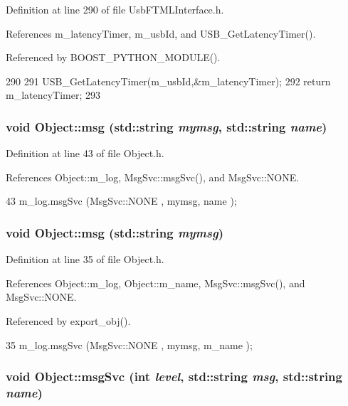 Definition at line 290 of file UsbFTMLInterface.h.

References m\_\-latencyTimer, m\_\-usbId, and USB\_\-GetLatencyTimer().

Referenced by BOOST\_\-PYTHON\_\-MODULE().


\begin{DoxyCode}
290                                 {
291     USB_GetLatencyTimer(m_usbId,&m_latencyTimer);
292     return m_latencyTimer;
293   }
\end{DoxyCode}
\hypertarget{classObject_ac5d59299273cee27aacf7de00d2e7034}{
\subsubsection[{msg}]{\setlength{\rightskip}{0pt plus 5cm}void Object::msg (std::string {\em mymsg}, \/  std::string {\em name})}}
\label{classObject_ac5d59299273cee27aacf7de00d2e7034}


Definition at line 43 of file Object.h.

References Object::m\_\-log, MsgSvc::msgSvc(), and MsgSvc::NONE.


\begin{DoxyCode}
43 { m_log.msgSvc (MsgSvc::NONE    , mymsg, name ); }
\end{DoxyCode}
\hypertarget{classObject_a58b2d0618c2d08cf2383012611528d97}{
\subsubsection[{msg}]{\setlength{\rightskip}{0pt plus 5cm}void Object::msg (std::string {\em mymsg})}}
\label{classObject_a58b2d0618c2d08cf2383012611528d97}


Definition at line 35 of file Object.h.

References Object::m\_\-log, Object::m\_\-name, MsgSvc::msgSvc(), and MsgSvc::NONE.

Referenced by export\_\-obj().


\begin{DoxyCode}
35 { m_log.msgSvc (MsgSvc::NONE    , mymsg, m_name ); }
\end{DoxyCode}
\hypertarget{classObject_a3f9d5537ebce0c0f2bf6ae4d92426f3c}{
\subsubsection[{msgSvc}]{\setlength{\rightskip}{0pt plus 5cm}void Object::msgSvc (int {\em level}, \/  std::string {\em msg}, \/  std::string {\em name})}}
\label{classObject_a3f9d5537ebce0c0f2bf6ae4d92426f3c}



